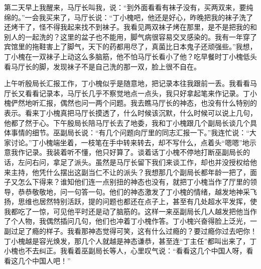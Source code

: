 \documentclass[12pt,oneside]{book}
\begin{document}
第二天早上我醒来，马厅长叫我，说：``到外面看看有袜子没有，买两双来，要纯绵的。''一会我买来了，马厅长说：``丁小槐吧，他还是好心，昨晚把我的袜子洗了还烤干了，怪不得我起来找不到袜子。我看见两双袜子烤在那里，是不是把我的和别人的一起洗的？这里的盆子也不能用，脚气病很容易交叉感染的。我有一年穿了宾馆里的拖鞋害上了脚气，天下的药都用尽了，真菌比日本鬼子还顽强些。''我想，丁小槐在一双袜子上动这么多脑筋，他不怕马厅长看小了他？吃早餐时丁小槐低头看马厅长的脚，发现袜子不是自己洗的那一双，脸上很不自在。

上午听殷局长汇报工作，丁小槐似乎是随意地，把记录本往我跟前一丢。我看看马厅长又看看记录本，马厅长几乎不察觉地点一点头，我只好拿起笔来作记录。丁小槐俨然地听汇报，偶然也问一两个问题。我去瞧马厅长的神态，也没有什么特别的表示。看来丁小槐真把马厅长摸透了，什么时候该沉默，什么时候可以说上几句，他都了然于心。下午殷局长陪马厅长去了地委，我和丁小槐跟几个副局长谈几个具体事情的细节。巫副局长说：``有几个问题向厅里的同志汇报一下。''我连忙说：``大家讨论。''丁小槐端坐着，一枝笔在手中转来转去，却不写什么，点着头``嗯嗯''地示意我作记录。我装着听不懂，他只好算了。谈着话丁小槐不停地打断巫副局长的话，左问右问，拿足了派头。虽然是马厅长留下我们来谈工作，却也并没授权给他来主持，他凭什么摆出这副当仁不让的派头？我想那几个副局长都年龄一把了，面子又怎么下得来？谁知他们连一点别扭的神态也没有，就把丁小槐当作了厅里的领导，恭恭敬敬地，问一句答一句。他们的神态激发了丁小槐的情绪，越发地神采飞扬，思维也居然特别活跃，提的问题也都还在点子上，甚至有几处超水平发挥，使我都吃了一惊，可见他平时还是动了脑筋的。这样一来巫副局长几人越发把他当作了个人物，我偶然插问几句，他们也冲着丁小槐作答。丁小槐兴奋得脸上泛光，一副过足了瘾的样子。我看那神态觉得可笑，这有什么过瘾的？要过瘾你过去吧你！丁小槐越是容光焕发，那几个人就越是神态谦恭，甚至连``丁主任''都叫出来了，丁小槐也不去纠正。我看着巫副局长等人，心里叹气说：``看看这几个中国人呀，看看这几个中国人吧！''
\end{document}
